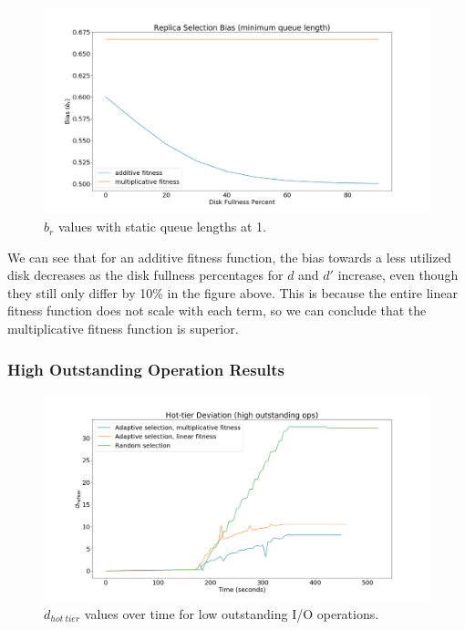 \documentclass[12pt]{article}
\begin{document}
    \begin{figure}[h]
      \centering
      \includegraphics[scale=0.30]{images/replica_selection_bias_min_qlen.png} 
      \caption{$b_r$ values with static queue lengths at 1.}
      \label{fig:bias_min_qlen}
    \end{figure}

    We can see that for an additive fitness function, the bias towards a less
    utilized disk decreases as the disk fullness percentages for $d$ and $d'$
    increase, even though they still only differ by 10\% in the figure above.
    This is because the entire linear fitness function does not scale with each
    term, so we can conclude that the multiplicative fitness function is
    superior.

    \subsubsection{High Outstanding Operation Results}

    \begin{figure}[h]
      \centering
      \includegraphics[scale=0.30]{images/high_outstanding_exp.png} 
      \caption{$d_{hot\ tier}$ values over time for low outstanding I/O
               operations.}
      \label{fig:high_outstanding_tier_disparity}
    \end{figure}
\end{document}
